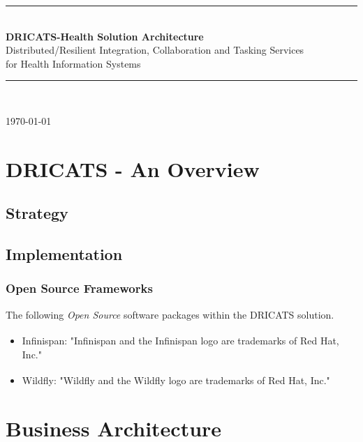 \documentclass[a4paper]{book}
\newcommand{\HRule}{\rule{0.8\linewidth}{0.5mm}}
\begin{document}
\begin{titlepage}
	\begin{center}


		\HRule \\[0.4cm]
		{ \huge \bfseries DRICATS-Health Solution Architecture\\[0.4cm] }
		Distributed/Resilient Integration, Collaboration and Tasking Services \\
		for Health Information Systems

		\HRule \\[1.5cm]


		\vfill

		{\large \today}

	\end{center}
\end{titlepage}

\tableofcontents

\part{DRICATS - An Overview}

\chapter{Strategy}

\chapter{Implementation}

\section{Open Source Frameworks}

The following \textit{Open Source} software packages within the DRICATS solution.

\begin{itemize}
 \item Infinispan\textsuperscript{\textregistered}:
"Infinispan and the Infinispan logo are trademarks of Red Hat, Inc."
 \item Wildfly\textsuperscript{\textregistered}:
"Wildfly and the Wildfly logo are trademarks of Red Hat, Inc."
\end{itemize}


\part{Business Architecture}
\end{document}
